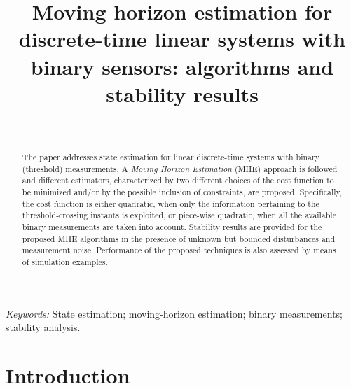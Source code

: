 \documentclass[11pt,journal,onecolumn]{IEEEtran}
\begin{document}
\title{Moving horizon estimation for discrete-time linear systems with binary sensors: algorithms and stability results}

\author{
 \\
}

\maketitle

\begin{abstract}
The paper addresses state estimation for linear discrete-time systems with binary (threshold) measurements. A \textit{Moving Horizon Estimation} (MHE) approach is followed and different estimators, characterized by two different choices of the cost function to be minimized and/or by the possible inclusion of constraints, are proposed. Specifically, the cost function is either quadratic, when only the information pertaining to the threshold-crossing instants is exploited, or piece-wise quadratic, when all the available binary measurements are taken into account. Stability results are provided for the proposed MHE algorithms in the presence of unknown but bounded disturbances and measurement noise. Performance of the proposed techniques is also assessed by means of simulation examples.
\end{abstract}

\textit{Keywords:} State estimation; moving-horizon estimation; binary measurements; stability analysis.

\section{Introduction}
\end{document}

